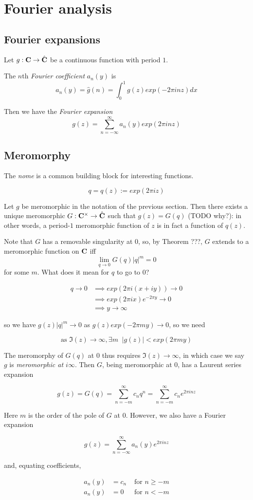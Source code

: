 \chapter{Fourier analysis}

\section{Fourier expansions}
\label{sec:fourier-expansions}

Let $g : \mathbf{C} \to \hat{\mathbf{C}}$ be a continuous function with period $1$.

The $n$th \emph{Fourier coefficient} $a_n(y)$ is
\[ a_n(y) = \hat g(n) = \int_0^1 g(z) exp(-2\pi i n z) dx \]

Then we have the \emph{Fourier expansion}
\[ g(z) = \sum_{n=-\infty}^\infty a_n(y) exp(2\pi inz) \]

\section{Meromorphy}
\label{sec:meromorphy}

The \emph{nome} is a common building block for interesting functions.

\[ q = q(z) := exp(2 \pi i z) \]

Let $g$ be meromorphic in the notation of the previous section. Then there
exists a unique meromorphic $G : \mathbf{C}^\times \to \hat{\mathbf{C}}$ such that $g(z) =
G(q)$ (TODO why?): in other words, a period-$1$ meromorphic function of $z$ is in fact a
function of $q(z)$.

Note that $G$ has a removable singularity at $0$, so, by Theorem ???, $G$
extends to a meromorphic function on $\mathbf{C}$ iff
\[ \lim_{q\to0} G(q) |q|^m = 0\] for some $m$. What does it mean for $q$ to go
to $0$?

\begin{align*}
  q \to 0 &\implies exp(2\pi i(x+iy)) \to 0\\
          &\implies exp(2\pi i x) e^{-2 \pi y} \to 0\\
          &\implies y \to \infty
\end{align*}

so we have \( g(z)|q|^m \to 0\) as \( g(z) exp(-2\pi m y) \to 0 \), so we need

\[ \text{as } \Im(z) \to \infty, \exists m\;\; |g(z)| < exp(2\pi my) \]

The meromorphy of $G(q)$ at $0$ thus requires $\Im(z)\to\infty$, in which case
we say $g$ is \emph{meromorphic at $i\infty$}. Then $G$, being meromorphic at
$0$, has a Laurent series expansion

\[ g(z) = G(q) = \sum_{n=-m}^\infty c_nq^n = \sum_{n=-m}^\infty c_n e^{2\pi inz} \]

Here $m$ is the order of the pole of $G$ at $0$. However, we also have a Fourier
expansion

\[ g(z) = \sum_{n=-\infty}^\infty a_n(y) e^{2\pi inz} \]

and, equating coefficients,

\begin{align*}
  a_n(y) &= c_n &\text{ for } n\ge -m\\
  a_n(y) &= 0   &\text{ for } n < -m
\end{align*}
